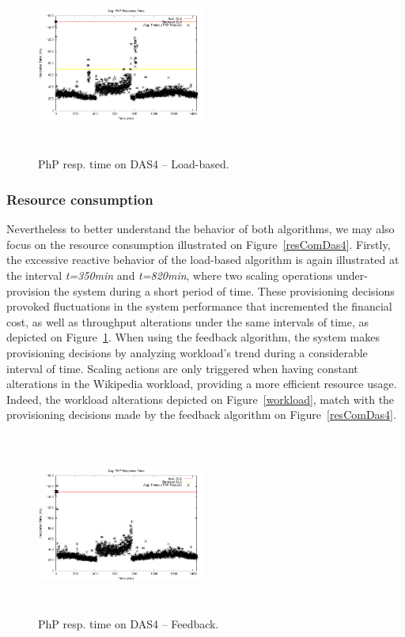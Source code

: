 \begin{figure}

\begin{center}
\includegraphics[width=0.49\textwidth, height=6cm]{./images/homogeneous/avgTimeout_PhP_naive}
\end{center}
\caption{PhP resp. time on DAS4 -- Load-based.}
\label{naiveDas4}
\end{figure}

\subsubsection{Resource consumption}

Nevertheless to better understand the behavior of both algorithms, we may also focus on the resource consumption illustrated on Figure~\ref{resComDas4}. Firstly, the excessive reactive behavior of the load-based algorithm is again illustrated at the interval \emph{t=350min} and \emph{t=820min}, where two scaling operations under-provision the system during a short period of time. These provisioning decisions provoked fluctuations in the system performance that incremented the financial cost, as well as throughput alterations under the same intervals of time, as depicted on Figure~\ref{naiveDas4}. When using the feedback algorithm, the system makes provisioning decisions by analyzing workload's trend during a considerable interval of time. Scaling actions are only triggered when having constant alterations in the Wikipedia workload, providing a more efficient resource usage. Indeed, the workload alterations depicted on Figure~\ref{workload}, match with the provisioning decisions made by the feedback algorithm on Figure~\ref{resComDas4}.

\begin{figure}
\begin{center}
\includegraphics[width=0.49\textwidth, height=6cm]{./images/homogeneous/avgTimeout_PhP_history}
\end{center}
\caption{PhP resp. time on DAS4 -- Feedback.}
\label{historyDas4}
\end{figure}

